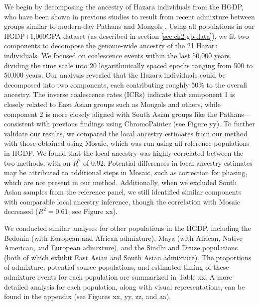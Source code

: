 We begin by decomposing the ancestry of Hazara individuals from the HGDP, who have been shown in previous studies to result from recent admixture between groups similar to modern-day Pathans and Mongols \cite{hellenthal2014genetic,salter2019fine}. Using all populations in our HGDP+1,000GPA dataset (as described in section \ref{sec:ch2-gb-data}), we fit two components to decompose the genome-wide ancestry of the 21 Hazara individuals. We focused on coalescence events within the last 50,000 years, dividing the time scale into 20 logarithmically spaced epochs ranging from 500 to 50,000 years. Our analysis revealed that the Hazara individuals could be decomposed into two components, each contributing roughly 50\% to the overall ancestry. The inverse coalescence rates (ICRs) indicate that component 1 is closely related to East Asian groups such as Mongols and others, while component 2 is more closely aligned with South Asian groups like the Pathans—consistent with previous findings using ChromoPainter (see Figure yy). To further validate our results, we compared the local ancestry estimates from our method with those obtained using Mosaic, which was run using all reference populations in HGDP. We found that the local ancestry was highly correlated between the two methods, with an $R^2$ of 0.92. Potential differences in local ancestry estimates may be attributed to additional steps in Mosaic, such as correction for phasing, which are not present in our method. Additionally, when we excluded South Asian samples from the reference panel, we still identified similar components with comparable local ancestry inference, though the correlation with Mosaic decreased ($R^2 = 0.61$, see Figure xx). 

We conducted similar analyses for other populations in the HGDP, including the Bedouin (with European and African admixture), Maya (with African, Native American, and European admixture), and the Sindhi and Druze populations (both of which exhibit East Asian and South Asian admixture). The proportions of admixture, potential source populations, and estimated timing of these admixture events for each population are summarized in Table xx. A more detailed analysis for each population, along with visual representations, can be found in the appendix (see Figures xx, yy, zz, and aa).